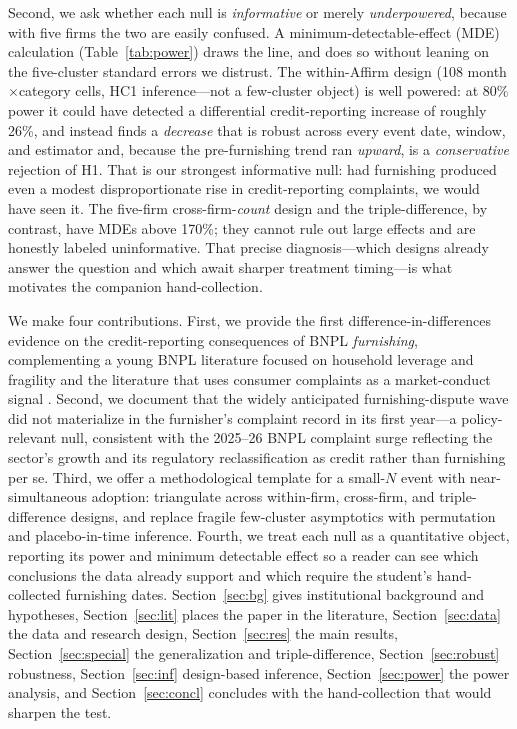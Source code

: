 \documentclass[12pt]{article}
\begin{document}
Second, we ask whether each null is \emph{informative} or merely \emph{underpowered}, because
with five firms the two are easily confused. A minimum-detectable-effect (MDE) calculation
(Table~\ref{tab:power}) draws the line, and does so without leaning on the five-cluster standard
errors we distrust. The within-Affirm design (108 month$\times$category cells, HC1 inference---not
a few-cluster object) is well powered: at 80\% power it could have detected a differential
credit-reporting increase of roughly 26\%, and instead finds a \emph{decrease} that is robust
across every event date, window, and estimator and, because the pre-furnishing trend ran
\emph{upward}, is a \emph{conservative} rejection of H1. That is our strongest informative null:
had furnishing produced even a modest disproportionate rise in credit-reporting complaints, we
would have seen it. The five-firm cross-firm-\emph{count} design and the triple-difference, by
contrast, have MDEs above 170\%; they cannot rule out large effects and are honestly labeled
uninformative. That precise diagnosis---which designs already answer the question and
which await sharper treatment timing---is what motivates the companion hand-collection.

We make four contributions. First, we provide the first difference-in-differences evidence on
the credit-reporting consequences of BNPL \emph{furnishing}, complementing a young BNPL
literature focused on household leverage and fragility \citep{dimaggio2022,guttman2023} and the
literature that uses consumer complaints as a market-conduct signal \citep{begley2021}. Second,
we document that the widely anticipated furnishing-dispute wave did not materialize in the
furnisher's complaint record in its first year---a policy-relevant null, consistent with the
2025--26 BNPL complaint surge reflecting the sector's growth and its regulatory
reclassification as credit \citep{cfpb2024} rather than furnishing per se. Third, we offer a
methodological template for a small-$N$ event with near-simultaneous adoption: triangulate
across within-firm, cross-firm, and triple-difference designs, and replace fragile few-cluster
asymptotics with permutation and placebo-in-time inference. Fourth, we treat each null as a
quantitative object, reporting its power and minimum detectable effect so a reader can see
which conclusions the data already support and which require the student's hand-collected
furnishing dates. Section~\ref{sec:bg} gives institutional background and hypotheses,
Section~\ref{sec:lit} places the paper in the literature, Section~\ref{sec:data} the data and
research design, Section~\ref{sec:res} the main results, Section~\ref{sec:special} the
generalization and triple-difference, Section~\ref{sec:robust} robustness,
Section~\ref{sec:inf} design-based inference, Section~\ref{sec:power} the power analysis, and
Section~\ref{sec:concl} concludes with the hand-collection that would sharpen the test.
\end{document}
